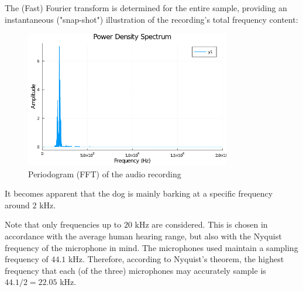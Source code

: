 \documentclass[a4paper,12pt]{article}
\numberwithin{equation}{section}
\numberwithin{figure}{section}
\numberwithin{table}{section}
\begin{document}



\newpage

The (Fast) Fourier transform is determined for the entire sample, providing an instantaneous ("snap-shot") illustration of the recording's total frequency content:

\begin{figure}[h!]
    \centering %
    \includegraphics[padding=1ex,width=0.8\textwidth,frame]{img/fft_example.png}
    \caption{Periodogram (FFT) of the audio recording}
    \label{fft_example}
\end{figure}

It becomes apparent that the dog is mainly barking at a specific frequency around $2$ kHz.

Note that only frequencies up to $20$ kHz are considered. This is chosen in accordance with the average human hearing range, but also with the Nyquist frequency of the microphone in mind. The microphones used maintain a sampling frequency of $44.1$ kHz. Therefore, according to Nyquist's theorem, the highest frequency that each (of the three) microphones may accurately sample is $44.1/2=22.05$ kHz. %
\end{document}
